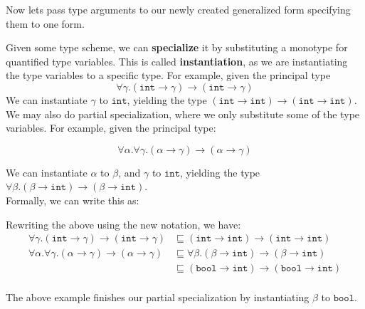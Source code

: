 \noindent
Now lets pass type arguments to our newly created generalized form specifying them to one form.
\begin{Def}

    Given some type scheme, we can \textbf{specialize} it by substituting a monotype for quantified type variables. This is called \textbf{instantiation}, as we are instantiating the type variables to a specific type.
    For example, given the principal type 
    $$\forall\gamma.(\texttt{int}\to\gamma)\to(\texttt{int}\to\gamma)$$
    \noindent
    We can instantiate $\gamma$ to $\texttt{int}$, yielding the type $(\texttt{int}\to\texttt{int})\to(\texttt{int}\to\texttt{int})$.\\

    \noindent
    We may also do partial specialization, where we only substitute some of the type variables. For example, given the principal type:

    $$\forall\alpha.\forall\gamma.(\alpha\to\gamma)\to(\alpha\to\gamma)$$

    \noindent
    We can instantiate $\alpha$ to $\beta$, and $\gamma$ to $\texttt{int}$, yielding the type $\forall\beta.(\beta\to\texttt{int})\to(\beta\to\texttt{int})$.\\

    \noindent
    Formally, we can write this as:

    \begin{center}
        \begin{prooftree}
        \end{prooftree}
    \end{center}

    \noindent
    Rewriting the above using the new notation, we have:
    \begin{align*}
        \forall\gamma.(\texttt{int}\to\gamma)\to(\texttt{int}\to\gamma) &\sqsubseteq (\texttt{int}\to\texttt{int})\to(\texttt{int}\to\texttt{int}) \\
        \forall\alpha.\forall\gamma.(\alpha\to\gamma)\to(\alpha\to\gamma) &\sqsubseteq \forall\beta.(\beta\to\texttt{int})\to(\beta\to\texttt{int}) \\
        &\sqsubseteq (\texttt{bool}\to\texttt{int})\to(\texttt{bool}\to\texttt{int}) \\
    \end{align*}

    \noindent
    The above example finishes our partial specialization by instantiating $\beta$ to $\texttt{bool}$.
\end{Def}

